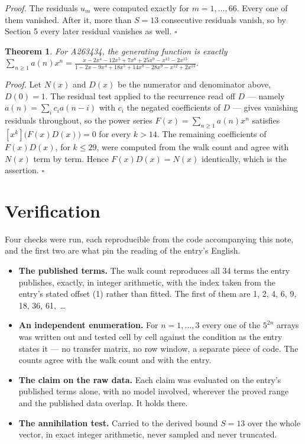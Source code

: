 \documentclass[11pt]{article}
\newtheorem{theorem}{Theorem}
\theoremstyle{definition}
\begin{document}
{\itshape Proof.} The residuals $u_m$ were computed exactly for $m = 1,\dots,66$. Every one of them vanished. After it, more than $S = 13$ consecutive residuals vanish, so by Section 5 every later residual vanishes as well. $\square$

\begin{theorem} For A263434, the generating function is exactly $\sum_{n\ge 1} a(n)x^n = \frac{x - 2x^{4} - 12x^{5} + 7x^{8} + 25x^{9} - x^{12} - 2x^{13}}{1 - 2x - 9x^{4} + 18x^{5} + 14x^{8} - 28x^{9} - x^{12} + 2x^{13}}$.\end{theorem}

{\itshape Proof.} Let $N(x)$ and $D(x)$ be the numerator and denominator above, $D(0)=1$. The residual test applied to the recurrence read off $D$ --- namely $a(n) = \sum_i c_i a(n-i)$ with $c_i$ the negated coefficients of $D$ --- gives vanishing residuals throughout, so the power series $F(x)=\sum_{n\ge 1}a(n)x^n$ satisfies $[x^k]\bigl(F(x)D(x)\bigr) = 0$ for every $k > 14$. The remaining coefficients of $F(x)D(x)$, for $k \le 29$, were computed from the walk count and agree with $N(x)$ term by term. Hence $F(x)D(x) = N(x)$ identically, which is the assertion. $\square$

\section{Verification}

Four checks were run, each reproducible from the code accompanying this note, and the first two are what pin the reading of the entry's English.

\begin{itemize}

\item {\bfseries The published terms.} The walk count reproduces all 34 terms the entry publishes, exactly, in integer arithmetic, with the index taken from the entry's stated offset (1) rather than fitted. The first of them are 1, 2, 4, 6, 9, 18, 36, 61,~\dots

\item {\bfseries An independent enumeration.} For $n = 1,\dots,3$ every one of the $5^{2n}$ arrays was written out and tested cell by cell against the condition as the entry states it --- no transfer matrix, no row window, a separate piece of code. The counts agree with the walk count and with the entry.

\item {\bfseries The claim on the raw data.} Each claim was evaluated on the entry's published terms alone, with no model involved, wherever the proved range and the published data overlap. It holds there.

\item {\bfseries The annihilation test.} Carried to the derived bound $S = 13$ over the whole vector, in exact integer arithmetic, never sampled and never truncated.

\end{itemize}
\end{document}
